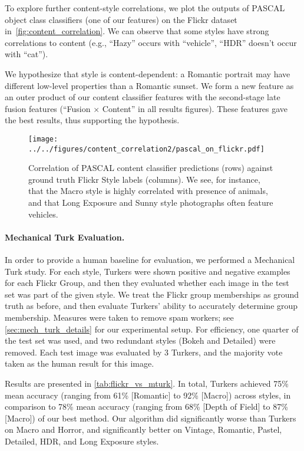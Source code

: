 To explore further content-style correlations, we plot the outputs of PASCAL object class classifiers (one of our features) on the Flickr dataset in~\autoref{fig:content_correlation}.
We can observe that some styles have strong correlations to content (e.g., ``Hazy'' occurs with ``vehicle'', ``HDR'' doesn't occur with ``cat'').

We hypothesize that style is content-dependent: a Romantic portrait may have different low-level properties than a Romantic sunset. We form a new feature as an outer product of our content classifier features with the second-stage late fusion features (``Fusion $\times$ Content'' in all results figures).  These features gave the best results, thus supporting the hypothesis.

\begin{figure}[h]
\centering
    \texttt{[image: ../../figures/content\_correlation2/pascal\_on\_flickr.pdf]}
    \caption{
        Correlation of PASCAL content classifier predictions (rows) against ground truth Flickr Style labels (columns).
        We see, for instance, that the Macro style is highly correlated with presence of animals, and that Long Exposure and Sunny style photographs often feature vehicles.
    }\label{fig:content_correlation}
\end{figure}

\vspace{-.5em}
\paragraph{Mechanical Turk Evaluation.}\label{sec:mech_turk_evaluation}
In order to provide a human baseline for evaluation, we performed a Mechanical Turk study.
For each style, Turkers were shown positive and negative examples for each Flickr Group, and then they evaluated whether each image in the test set was part of the given style.
We treat the Flickr group memberships as ground truth as before, and then evaluate Turkers' ability to accurately determine group membership.
Measures were taken to remove spam workers; see \autoref{sec:mech_turk_details} for our experimental setup.
For efficiency, one quarter of the test set was used, and two redundant styles (Bokeh and Detailed) were removed.
Each test image was evaluated by 3 Turkers, and the majority vote taken as the human result for this image.

Results are presented in \autoref{tab:flickr_vs_mturk}.
In total, Turkers achieved 75\% mean accuracy (ranging from 61\% [Romantic] to 92\% [Macro]) across styles, in comparison to 78\% mean accuracy (ranging from 68\% [Depth of Field] to 87\% [Macro]) of our best method.
Our algorithm did significantly worse than Turkers on Macro and Horror, and significantly better on Vintage, Romantic, Pastel, Detailed, HDR, and Long Exposure styles.


